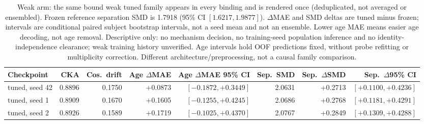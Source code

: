 \begin{table}[!t]
\caption{Weak arm: the same bound weak tuned family appears in every binding and is rendered once (deduplicated, not averaged or ensembled). Frozen reference separation SMD is 1.7918 (95\% CI $[1.6217,1.9877]$). $\Delta$MAE and SMD deltas are tuned minus frozen; intervals are conditional paired subject bootstrap intervals, not a seed mean and not an ensemble. Lower age MAE means easier age decoding, not age removal. Descriptive only: no mechanism decision, no training-seed population inference and no identity-independence clearance; weak training history unverified. Age intervals hold OOF predictions fixed, without probe refitting or multiplicity correction. Different architecture/preprocessing, not a causal family comparison.}
\label{tab:common-mechanism-weak}
\centering\scriptsize
\begin{tabular}{@{}lrrrrrrr@{}}
\toprule
Checkpoint & CKA & Cos.\ drift & Age $\Delta$MAE & Age $\Delta$MAE 95\% CI & Sep.\ SMD & Sep.\ $\Delta$SMD & Sep.\ $\Delta$95\% CI \\
\midrule
tuned, seed 42 & 0.8896 & 0.1750 & +0.0873 & $[-0.1872,+0.3449]$ & 2.0631 & +0.2713 & $[+0.1100,+0.4236]$ \\
tuned, seed 1 & 0.8909 & 0.1670 & +0.1605 & $[-0.1255,+0.4245]$ & 2.0686 & +0.2768 & $[+0.1181,+0.4291]$ \\
tuned, seed 2 & 0.8926 & 0.1589 & +0.1719 & $[-0.1025,+0.4370]$ & 2.0767 & +0.2849 & $[+0.1309,+0.4288]$ \\
\bottomrule
\end{tabular}
\end{table}
